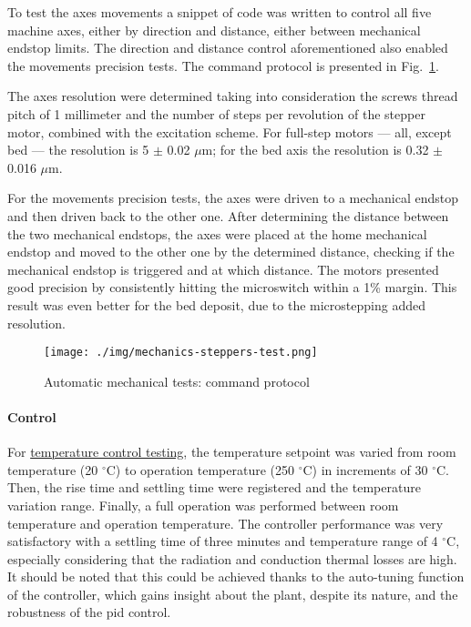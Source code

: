 To test the axes movements a snippet of code was written to control all five
machine axes, either by direction and distance, either between mechanical
endstop limits.
The direction and distance control aforementioned also enabled the movements
precision tests. The command protocol is presented in
Fig.~\ref{fig:mechanics-steppers-test}.

The axes resolution were determined taking into consideration the screws thread
pitch of 1 millimeter and the number of steps per revolution of the stepper
motor, combined with the excitation scheme. For full-step motors --- all, except
bed --- the resolution is 5 $\pm$ 0.02 $\mu$m; for the bed axis the resolution
is 0.32 $\pm$ 0.016 $\mu$m.

For the movements precision tests, the axes were driven to a mechanical endstop
and then driven back to the other one. After determining the distance between
the two mechanical endstops, the axes were placed at the home mechanical endstop
and moved to the other one by the determined distance, checking if the
mechanical endstop is triggered and at which distance. The motors presented good
precision by consistently hitting the microswitch within a 1\% margin. This
result was even better for the bed deposit, due to the microstepping added resolution.

\begin{figure}[!hbt]
  \centering
    \texttt{[image: ./img/mechanics-steppers-test.png]}
  \caption{Automatic mechanical tests: command protocol}%
\label{fig:mechanics-steppers-test}
\end{figure}

\paragraph{Control}
For \underline{temperature control testing}, the temperature setpoint was varied from room
temperature (20 $^{\circ}$C) to operation temperature (250 $^{\circ}$C) in
increments of 30 $^{\circ}$C. Then, the rise time and settling time were
registered and the temperature variation range. Finally, a full operation was
performed between room temperature and operation temperature. The controller
performance was very satisfactory with a settling time of three minutes and
temperature range of 4 $^{\circ}$C, especially considering that the radiation
and conduction thermal losses are high. It should be noted that this could be
achieved thanks to the auto-tuning function of the controller, which gains
insight about the plant, despite its nature, and the robustness of the \gls{pid}
control.

